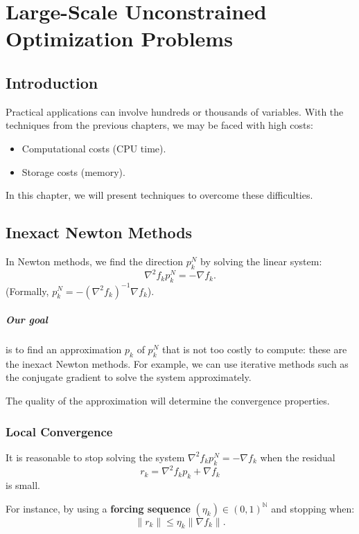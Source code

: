 \chapter{Large-Scale Unconstrained Optimization Problems}
\label{chap:large-scale}

\section{Introduction}

Practical applications can involve hundreds or thousands of variables.
With the techniques from the previous chapters, we may be faced with high costs:
\begin{itemize}
    \item Computational costs (CPU time).
    \item Storage costs (memory).
\end{itemize}

In this chapter, we will present techniques to overcome these difficulties.

\section{Inexact Newton Methods}

In Newton methods, we find the direction $p_k^N$ by solving the linear system:
\[
    \nabla^2 f_k p_k^N = - \nabla f_k.
\]
(Formally, $p_k^N = - (\nabla^2 f_k)^{-1} \nabla f_k$).

\paragraph{Our goal} is to find an approximation $p_k$ of $p_k^N$ that is not too costly to compute: these are the inexact Newton methods.
For example, we can use iterative methods such as the conjugate gradient to solve the system approximately.

The quality of the approximation will determine the convergence properties.

\subsection{Local Convergence}

It is reasonable to stop solving the system $\nabla^2 f_k p_k^N = -\nabla f_k$ when the residual
\[
    r_k = \nabla^2 f_k p_k + \nabla f_k
\]
is small.

For instance, by using a \textbf{forcing sequence} $(\eta_k) \in (0, 1)^\mathbb{N}$ and stopping when:
\begin{equation}
    \| r_k \| \le \eta_k \| \nabla f_k \|.
\end{equation}


